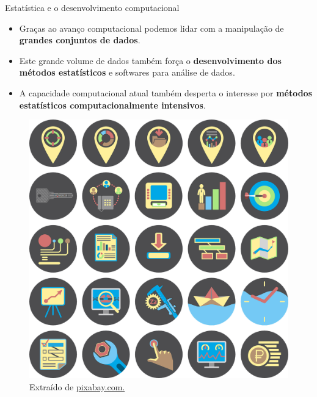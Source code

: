 \documentclass[
  ignorenonframetext,
  serif,
  professionalfont,
  usenames,
  dvipsnames,
  aspectratio = 169]{beamer}
\providecommand{\tightlist}{%
  \setlength{\itemsep}{0pt}\setlength{\parskip}{0pt}}
\renewcommand{\tightlist}{%
  \setlength{\itemsep}{0\baselineskip}
  \setlength{\parskip}{0.25\baselineskip}
}
\def\beginAHalfColumn{\begin{minipage}{0.49\textwidth}}%
\def\endColumns{\end{minipage}}%
\begin{document}
\begin{frame}{Estatística e o desenvolvimento computacional}
\label{estatuxedstica-e-o-desenvolvimento-computacional-1}
\beginAHalfColumn

\begin{itemize}
\tightlist
\item
  Graças ao avanço computacional podemos lidar com a manipulação de
  \textbf{grandes conjuntos de dados}.
\end{itemize}

\vspace{0.3cm}

\begin{itemize}
\tightlist
\item
  Este grande volume de dados também força o
  \textbf{desenvolvimento dos métodos estatísticos} e softwares para
  análise de dados.
\end{itemize}

\vspace{0.3cm}

\begin{itemize}
\tightlist
\item
  A capacidade computacional atual também desperta o interesse por
  \textbf{métodos estatísticos computacionalmente intensivos}.
\end{itemize}

\endColumns
\beginAHalfColumn

\begin{figure}

{\centering \includegraphics[width=0.6\linewidth]{./img/ti} 

}

\caption{Extraído de \href{https://cdn.pixabay.com/photo/2015/04/14/23/17/it-business-722950_1280.png}{pixabay.com.}}\label{fig:unnamed-chunk-3}
\end{figure}

\endColumns
\end{frame}
\end{document}
